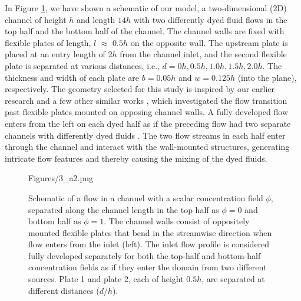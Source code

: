 \documentclass[reprint,a4paper,fleqn]{cas-dc} %
\begin{document}
	In Figure \ref{fig:schematic}, we have shown a schematic of our model, a two-dimensional (2D) channel of height $h$ and length $14h$ with two differently dyed fluid flows in the top half and the bottom half of the channel. The channel walls are fixed with flexible plates of length, $l$ $\approx$ $0.5h$ on the opposite wall. The upstream plate is placed at an entry length of $2h$ from the channel inlet, and the second flexible plate is separated at various distances, i.e., $d=0h, 0.5h,1.0h,1.5h, 2.0h$. The thickness and width of each plate are $b = 0.05h$ and $w=0.125h$ (into the plane), respectively. The geometry selected for this study is inspired by our earlier research and a few other similar works \cite{Self2019, Jin2018}, which investigated the flow transition past flexible plates mounted on opposing channel walls. A fully developed flow enters from the left on each dyed half as if the preceding flow had two separate channels with differently dyed fluids \cite{Jing2022,Liao2023}. The two flow streams in each half enter through the channel and interact with the wall-mounted structures, generating intricate flow features and thereby causing the mixing of the dyed fluids.
	\begin{figure}[pos=b]
		\begin{minipage}[c]{1\linewidth}	
				\begin{overpic}[width=1\linewidth]{Figures/3_a2.png}
				\end{overpic}
			\end{minipage}
			\caption{Schematic of a flow in a channel with a scalar concentration field $\phi$, separated along the channel length in the top half as $\phi=0$ and bottom half as $\phi=1$. The channel walls consist of oppositely mounted flexible plates that bend in the streamwise direction when flow enters from the inlet (left). The inlet flow profile is considered fully developed separately for both the top-half and bottom-half concentration fields as if they enter the domain from two different sources. Plate 1 and plate 2, each of height $0.5h$, are separated at different distances ($d/h$).}
			\label{fig:schematic}
		\end{figure}\vspace{0cm}
\end{document}
